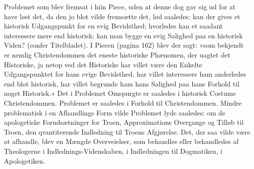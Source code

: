 \documentclass[12pt,a4paper]{article}
\begin{document}
Problemet som blev fremsat i hiin Piece, uden at denne dog gav sig ud for at have løst det, da den jo blot vilde fremsætte det, lød saaledes: kan der gives et historisk Udgangspunkt for en evig Bevidsthed; hvorledes kan et saadant interessere mere end historisk; kan man bygge en evig Salighed paa en historisk Viden? (confer Titelbladet). I Piecen (pagina 162) blev der sagt: »som bekjendt er nemlig Christendommen det eneste historiske Phænomen, der uagtet det Historiske, ja netop ved det Historiske har villet være den Enkelte Udgangspunktet for hans evige Bevidsthed, har villet interessere ham anderledes end blot historisk, har villet begrunde ham hans Salighed paa hans Forhold til noget Historisk.« Det i Problemet Omspurgte er saaledes i historisk Costume Christendommen. Problemet er saaledes i Forhold til Christendommen. Mindre problematisk i en Afhandlings Form vilde Problemet lyde saaledes: om de apologetiske Forudsætninger for Troen, Approximations Overgange og Tilløb til Troen, den qvantiterende Indledning til Troens Afgjørelse. Det, der saa vilde være at afhandle, blev en Mængde Overveielser, som behandles eller behandledes af Theologerne i Indlednings-Videnskaben, i Indledningen til Dogmatiken, i Apologetiken.
\end{document}
